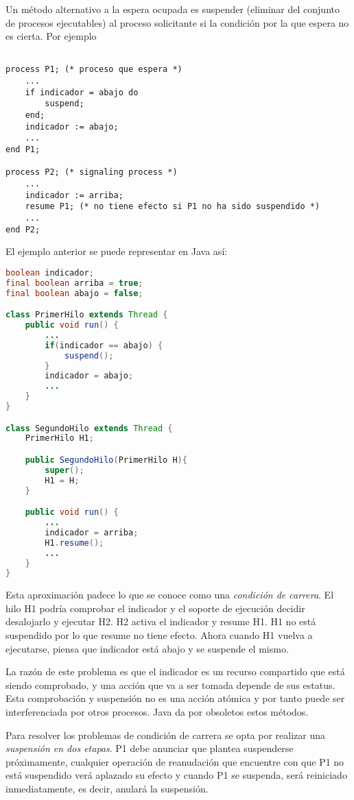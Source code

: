 Un método alternativo a la espera ocupada es suspender (eliminar del conjunto de
procesos ejecutables) al proceso solicitante si la condición por la que espera
no es cierta. Por ejemplo

\begin{lstlisting}

process P1; (* proceso que espera *)
	...
	if indicador = abajo do
		suspend;
	end;
	indicador := abajo;
	...
end P1;

process P2; (* signaling process *)
	...
	indicador := arriba;
	resume P1; (* no tiene efecto si P1 no ha sido suspendido *)
	...
end P2;

\end{lstlisting}

El ejemplo anterior se puede representar en Java así:

\begin{lstlisting}[language=Java]
boolean indicador;
final boolean arriba = true;
final boolean abajo = false;

class PrimerHilo extends Thread {
	public void run() {
		...
		if(indicador == abajo) {
			suspend();
		}
		indicador = abajo;
		...
	}
}

class SegundoHilo extends Thread {
	PrimerHilo H1;

	public SegundoHilo(PrimerHilo H){
		super();
		H1 = H;
	}

	public void run() {
		...
		indicador = arriba;
		H1.resume();
		...
	}
}

\end{lstlisting}

Esta aproximación padece lo que se conoce como una \emph{condición de carrera}.
El hilo H1 podría comprobar el indicador y el soporte de ejecución decidir
desalojarlo y ejecutar H2. H2 activa el indicador y resume H1. H1 no está
suspendido por lo que resume no tiene efecto. Ahora cuando H1 vuelva a
ejecutarse, piensa que indicador está abajo y se suspende el mismo.

La razón de este problema es que el indicador es un recurso compartido que está
siendo comprobado, y una acción que va a ser tomada depende de sus estatus. Esta
comprobación y suspensión no es una acción atómica y por tanto puede ser
interferenciada por otros procesos. Java da por obsoletos estos métodos.

Para resolver los problemas de condición de carrera se opta por realizar una
\emph{suspensión en dos etapas}. P1 debe anunciar que plantea suspenderse
próximamente, cualquier operación de reanudación que encuentre con que P1 no
está suspendido verá aplazado su efecto y cuando P1 se suspenda, será reiniciado
inmediatamente, es decir, anulará la suspensión.

